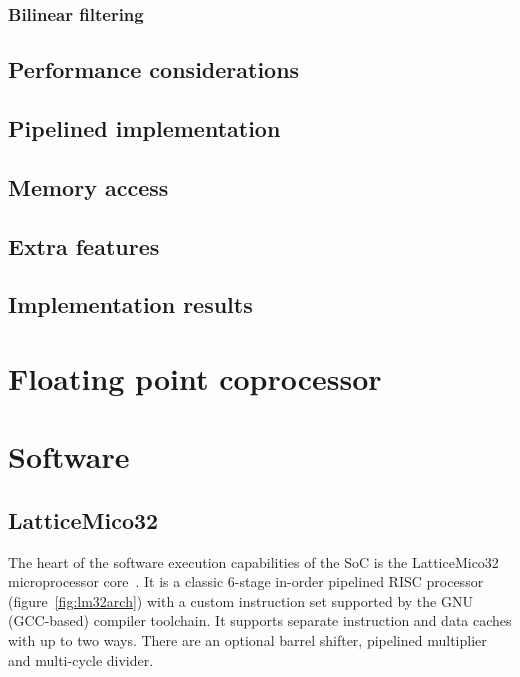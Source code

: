 \documentclass[a4paper,11pt]{kthesis}
\begin{document}
\subsection{Bilinear filtering}


\section{Performance considerations}

\section{Pipelined implementation}

\section{Memory access}

\section{Extra features}

\section{Implementation results}

\chapter{Floating point coprocessor}
\label{ch:pfpu}

\chapter{Software}
\label{ch:sw}
\section{LatticeMico32}
The heart of the software execution capabilities of the SoC is the LatticeMico32 microprocessor core~\cite{mico32}. It is a classic 6-stage in-order pipelined RISC processor (figure~\ref{fig:lm32arch}) with a custom instruction set supported by the GNU (GCC-based) compiler toolchain. It supports separate instruction and data caches with up to two ways. There are an optional barrel shifter, pipelined multiplier and multi-cycle divider.
\end{document}
